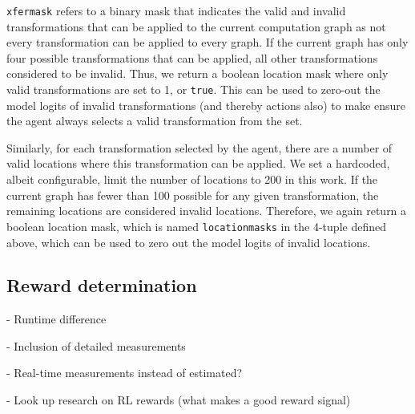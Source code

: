 \texttt{xfer\textunderscore mask} refers to a binary mask that indicates the valid and invalid transformations that can be applied to the current computation graph as not every transformation can be applied to every graph. If the current graph has only four possible transformations that can be applied, all other transformations considered to be invalid. Thus, we return a boolean location mask where only valid transformations are set to 1, or \texttt{true}. This can be used to zero-out the model logits of invalid transformations (and thereby actions also) to make ensure the agent always selects a valid transformation from the set.

Similarly, for each transformation selected by the agent, there are a number of valid locations where this transformation can be applied. We set a hardcoded, albeit configurable, limit the number of locations to 200 in this work. If the current graph has fewer than 100 possible for any given transformation, the remaining locations are considered invalid locations. Therefore, we again return a boolean location mask, which is named \texttt{location\textunderscore masks} in the 4-tuple defined above, which can be used to zero out the model logits of invalid locations.


\subsection{Reward determination}
\label{sec:prob:subsec:rwd}
- Runtime difference

- Inclusion of detailed measurements

- Real-time measurements instead of estimated?

- Look up research on RL rewards (what makes a good reward signal)
